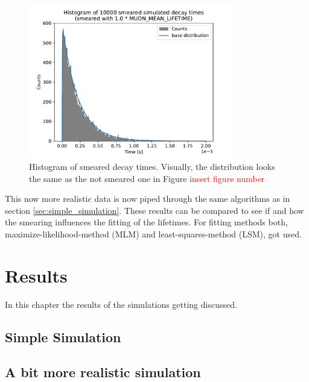 \documentclass[11pt, a4paper, oneside]{book}
\newcommand\Plotwidth{0.8}
\begin{document}
\begin{figure}[h]
    \centering
    \includegraphics[width=\Plotwidth\textwidth]{images/smeared_decay_histogram_150bins.pdf}
    \caption{Histogram of smeared decay times. Visually, the distribution looks the same as the not smeared one in Figure \textcolor{red}{insert figure number}}
    \label{fig:smeared_hist}
\end{figure}

This now more realistic data is now piped through the same algorithms as in section \ref{sec:simple_simulation}. These results can be compared to see if and how the smearing influences the fitting of the lifetimes. For fitting methods both, maximize-likelihood-method (MLM) and least-squares-method (LSM), got used.  

\chapter{Results}

In this chapter the results of the simulations getting discussed.

\section{Simple Simulation}

\section{A bit more realistic simulation}
\end{document}
